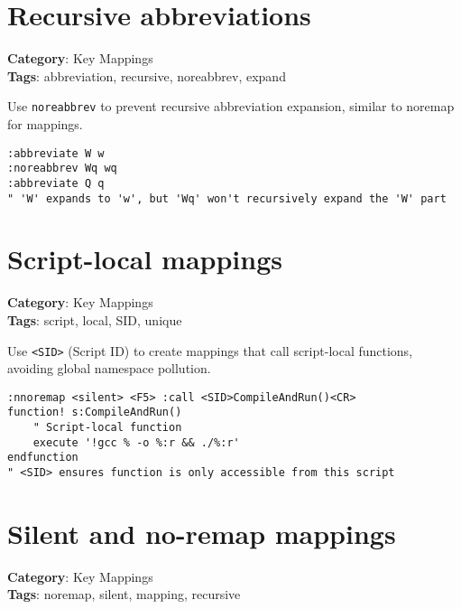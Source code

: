 \section{Recursive abbreviations}

\textbf{Category}: Key Mappings\\ \textbf{Tags}: abbreviation, recursive, noreabbrev, expand
\vspace{0.5cm}

Use {\footnotesize \Verb§noreabbrev§} to prevent recursive abbreviation expansion, similar to noremap for mappings.

\begin{Exa*}{}
\begin{Verbatim}[fontsize=\footnotesize, breaklines, breakanywhere]
:abbreviate W w
:noreabbrev Wq wq
:abbreviate Q q
" 'W' expands to 'w', but 'Wq' won't recursively expand the 'W' part
\end{Verbatim}
\end{Exa*}

\section{Script-local mappings}

\textbf{Category}: Key Mappings\\ \textbf{Tags}: script, local, SID, unique
\vspace{0.5cm}

Use {\footnotesize \Verb§<SID>§} (Script ID) to create mappings that call script-local functions, avoiding global namespace pollution.

\begin{Exa*}{}
\begin{Verbatim}[fontsize=\footnotesize, breaklines, breakanywhere]
:nnoremap <silent> <F5> :call <SID>CompileAndRun()<CR>
function! s:CompileAndRun()
    " Script-local function
    execute '!gcc % -o %:r && ./%:r'
endfunction
" <SID> ensures function is only accessible from this script
\end{Verbatim}
\end{Exa*}

\section{Silent and no-remap mappings}

\textbf{Category}: Key Mappings\\ \textbf{Tags}: noremap, silent, mapping, recursive
\vspace{0.5cm}

